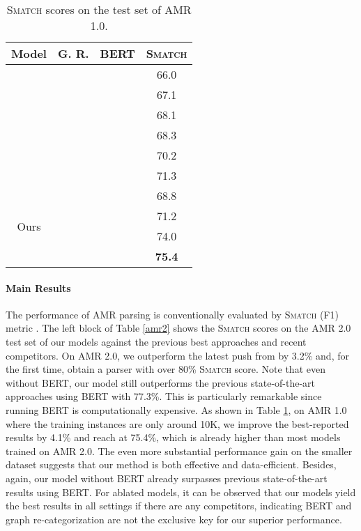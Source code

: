 \documentclass[11pt,a4paper]{article}
\begin{document}
	\begin{table}[t]
		\centering
		\small
		\begin{tabular}{c|c|c|c}
			\hline
			Model & \scriptsize{G. R.}& \scriptsize{BERT} & \scriptsize{\textsc{Smatch}} \\
			\hline
			\newcite{flanigan2016cmu}&\texttimes& \texttimes& 66.0 \\
			\newcite{pust2015parsing} &\texttimes& \texttimes& 67.1 \\
			\newcite{wang2017getting} && \texttimes& 68.1\\
			\newcite{guo2018better} && \texttimes& 68.3 \\
			\newcite{zhang-etal-2019-amr} && & 70.2\\
			\newcite{zhang-etal-2019-broad} && & 71.3 \\
			\hline
			\multirow{4}{*}{Ours} &\texttimes& \texttimes& 68.8\\
			&& \texttimes& 71.2\\
			&\texttimes && 74.0\\
			&& &\textbf{75.4}\\
			\hline
		\end{tabular}
		\caption{\textsc{Smatch} scores on the test set of AMR 1.0.}
		\label{amr1}
	\end{table}
	\paragraph{Main Results} The performance of AMR parsing is conventionally evaluated by \textsc{Smatch} (F1) metric \cite{cai2013smatch}. The left block of Table \ref{amr2} shows the \textsc{Smatch} scores on the AMR 2.0 test set of our models against the previous best approaches and recent competitors. On AMR 2.0, we outperform the latest push from  by 3.2\% and, for the first time, obtain a parser with over 80\% \textsc{Smatch} score. Note that even without BERT, our model still outperforms the previous state-of-the-art approaches using BERT \cite{zhang-etal-2019-broad,zhang-etal-2019-amr} with 77.3\%. This is particularly remarkable since running BERT is computationally expensive. As shown in Table \ref{amr1}, on AMR 1.0 where the training instances are only around 10K, we improve the best-reported results by 4.1\% and reach at 75.4\%, which is already higher than most models trained on AMR 2.0. The even more substantial performance gain on the smaller dataset suggests that our method is both effective and data-efficient. Besides, again, our model without BERT already surpasses previous state-of-the-art results using BERT. For ablated models, it can be observed that our models yield the best results in all settings if there are any competitors, indicating BERT and graph re-categorization are not the exclusive key for our superior performance.
\end{document}
